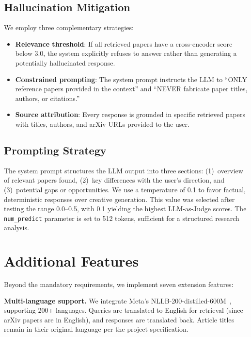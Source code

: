 \documentclass[11pt,a4paper]{article}
\begin{document}
\subsection{Hallucination Mitigation}

We employ three complementary strategies:
\begin{itemize}
  \item \textbf{Relevance threshold}: If all retrieved papers have a cross-encoder score below 3.0, the system explicitly refuses to answer rather than generating a potentially hallucinated response.
  \item \textbf{Constrained prompting}: The system prompt instructs the LLM to ``ONLY reference papers provided in the context'' and ``NEVER fabricate paper titles, authors, or citations.''
  \item \textbf{Source attribution}: Every response is grounded in specific retrieved papers with titles, authors, and arXiv URLs provided to the user.
\end{itemize}

\subsection{Prompting Strategy}

The system prompt structures the LLM output into three sections: (1)~overview of relevant papers found, (2)~key differences with the user's direction, and (3)~potential gaps or opportunities. We use a temperature of 0.1 to favor factual, deterministic responses over creative generation. This value was selected after testing the range 0.0--0.5, with 0.1 yielding the highest LLM-as-Judge scores. The \texttt{num\_predict} parameter is set to 512 tokens, sufficient for a structured research analysis.

\section{Additional Features}

Beyond the mandatory requirements, we implement seven extension features:

\textbf{Multi-language support.} We integrate Meta's NLLB-200-distilled-600M~\cite{nllb}, supporting 200+ languages. Queries are translated to English for retrieval (since arXiv papers are in English), and responses are translated back. Article titles remain in their original language per the project specification.
\end{document}
